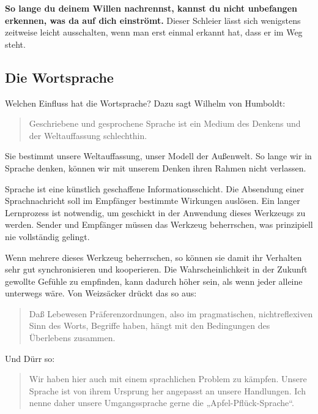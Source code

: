 \documentclass[12pt]{book}
\begin{document}
\textbf{So lange du deinem Willen nachrennst, kannst du nicht unbefangen erkennen, was da auf dich einströmt.} Dieser Schleier lässt sich wenigstens zeitweise leicht ausschalten, wenn man erst einmal erkannt hat, dass er im Weg steht.

\subsection{Die Wortsprache}

Welchen Einfluss hat die Wortsprache? Dazu sagt Wilhelm von Humboldt:

\begin{quote}\begin{tcolorbox}
Geschriebene und gesprochene Sprache ist ein Medium des Denkens und der Weltauffassung schlechthin.
\end{tcolorbox}\end{quote}

Sie bestimmt unsere Weltauffassung, unser Modell der Außenwelt. So lange wir in Sprache denken, können wir mit unserem Denken ihren Rahmen nicht verlassen. 

Sprache ist eine künstlich geschaffene Informationsschicht. Die Absendung einer Sprachnachricht soll im Empfänger bestimmte Wirkungen auslösen. Ein langer Lernprozess ist notwendig, um geschickt in der Anwendung dieses Werkzeugs zu werden. Sender und Empfänger müssen das Werkzeug beherrschen, was prinzipiell nie vollständig gelingt.

Wenn mehrere dieses Werkzeug beherrschen, so können sie damit ihr Verhalten sehr gut synchronisieren und kooperieren. Die Wahrscheinlichkeit in der Zukunft gewollte Gefühle zu empfinden, kann dadurch höher sein, als wenn jeder alleine unterwegs wäre. Von Weizsäcker drückt das so aus:

\begin{quote}\begin{tcolorbox}
Daß Lebewesen Präferenzordnungen, also im pragmatischen, nichtreflexiven Sinn des Worts, Begriffe haben, hängt mit den Bedingungen des Überlebens zusammen.
\end{tcolorbox}\end{quote}

Und Dürr so:
\begin{quote}\begin{tcolorbox}
Wir haben hier auch mit einem sprachlichen Problem zu kämpfen. Unsere Sprache ist von ihrem Ursprung her angepasst an unsere Handlungen. Ich nenne daher unsere Umgangssprache gerne die „Apfel-Pflück-Sprache“.
\end{tcolorbox}\end{quote}
\end{document}
